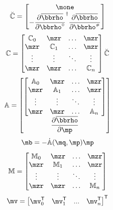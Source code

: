 \documentclass[a4paper,11pt,brazil,fleqn]{article}
\begin{document}
\begin{equation} \label{eq:MatrizCchapeu}
\breve{\mC} = \begin{bmatrix}
\mone \\
- \displaystyle\frac{\partial \overline{\mrho}}{\partial \mrho\cir}^\msP \frac{\partial \overline{\mrho}}{\partial \mrho\ssh }
\end{bmatrix}
\end{equation}
\begin{equation} \label{eq:MatrizC2}
\mC = 
\begin{bmatrix}
\mC_0 &  \mzr  & \ldots & \mzr\\
\mzr  &  \mC_1 & \ldots & \mzr\\
\vdots & \vdots & \ddots & \vdots\\
\mzr  &   \mzr       &\ldots & \mC_{n}
\end{bmatrix}
\breve{\mC}
\end{equation}
\begin{equation} \label{eq:MatrizA2}
\mA = 
\begin{bmatrix}
\begin{bmatrix}
\mA_0  & \mzr & \ldots & \mzr\\
\mzr & \mA_1 & \ldots & \mzr\\
\vdots & \vdots & \ddots & \vdots\\
\mzr  & \mzr     &\ldots & \mA_{n}
\end{bmatrix} \\
\displaystyle\frac{\partial \overline{\mrho}}{\partial \mp}
\end{bmatrix}
\end{equation}
\begin{equation} \label{eq:Matrizb2}
\mb = - \dot{\mA}(\mq,\mp) \mp
\end{equation}
\begin{equation} \label{eq:MatrizM2}
\mM =
\begin{bmatrix}
\mM_0 &  \mzr  & \ldots & \mzr\\
\mzr  &  \mM_1 & \ldots & \mzr\\
\vdots & \vdots & \ddots & \vdots\\
\mzr  &   \mzr       &\ldots & \mM_{n}
\end{bmatrix}
\end{equation}
\begin{equation} \label{eq:Matrizv2}
\mv = \begin{bmatrix}
\mv_0^\msT & \mv_1^\msT & ... & \mv_{n}^\msT
\end{bmatrix}^\msT
\end{equation}
\end{document}
